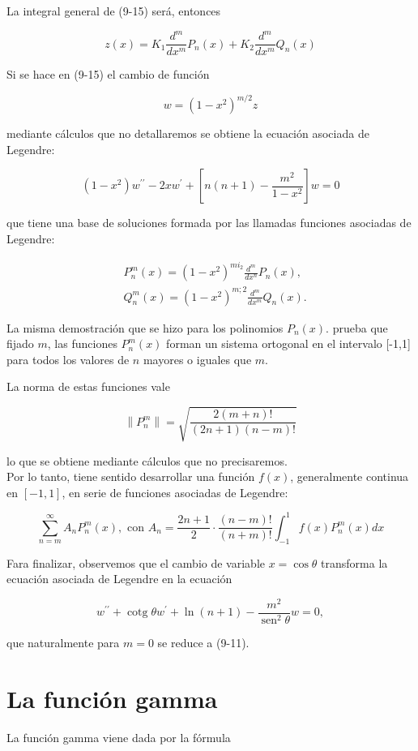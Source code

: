 \documentclass[10pt]{article}
\theoremstyle{plain}
\theoremstyle{definition}
\theoremstyle{remark}
\begin{document}
La integral general de (9-15) será, entonces

$$
z(x)=K_{1} \frac{d^{m}}{d x^{m}} P_{n}(x)+K_{2} \frac{d^{m}}{d x^{m}} Q_{n}(x)
$$

Si se hace en (9-15) el cambio de función

$$
w=\left(1-x^{2}\right)^{m / 2} z
$$

mediante cálculos que no detallaremos se obtiene la ecuación asociada de Legendre:


$$
\left(1-x^{2}\right) w^{\prime \prime}-2 x w^{\prime}+\left[n(n+1)-\frac{m^{2}}{1-x^{2}}\right] w=0
$$

que tiene una base de soluciones formada por las llamadas funciones asociadas de Legendre:

$$
\begin{aligned}
& P_{n}^{m}(x)=\left(1-x^{2}\right)^{m i_{2}} \frac{d^{m}}{d x^{n}} P_{n}(x), \\
& Q_{n}^{m}(x)=\left(1-x^{2}\right)^{m ; 2} \frac{d^{m}}{d x^{m}} Q_{n}(x) .
\end{aligned}
$$

La misma demostración que se hizo para los polinomios $P_{n}(x)$. prueba que fijado $m$, las funciones $P_{n}^{m}(x)$ forman un sistema ortogonal en el intervalo [-1,1] para todos los valores de $n$ mayores o iguales que $m$.

La norma de estas funciones vale

$$
\left\|P_{n}^{m}\right\|=\sqrt{\frac{2(m+n)!}{(2 n+1)(n-m)!}}
$$

lo que se obtiene mediante cálculos que no precisaremos.\\
Por lo tanto, tiene sentido desarrollar una función $f(x)$, generalmente continua en $[-1,1]$, en serie de funciones asociadas de Legendre:

$$
\sum_{n=m}^{\infty} A_{n} P_{n}^{m}(x), \text { con } A_{n}=\frac{2 n+1}{2} \cdot \frac{(n-m)!}{(n+m)!} \int_{-1}^{1} f(x) P_{n}^{m}(x) d x
$$

Fara finalizar, observemos que el cambio de variable $x=\cos \theta$ transforma la ecuación asociada de Legendre en la ecuación


\begin{equation*}
w^{\prime \prime}+\operatorname{cotg} \theta w^{\prime}+\ln (n+1)-\frac{m^{2}}{\operatorname{sen}^{2} \theta} w=0, \tag{9-16}
\end{equation*}


que naturalmente para $m=0$ se reduce a (9-11).

\section{La función gamma}
La función gamma viene dada por la fórmula
\end{document}
